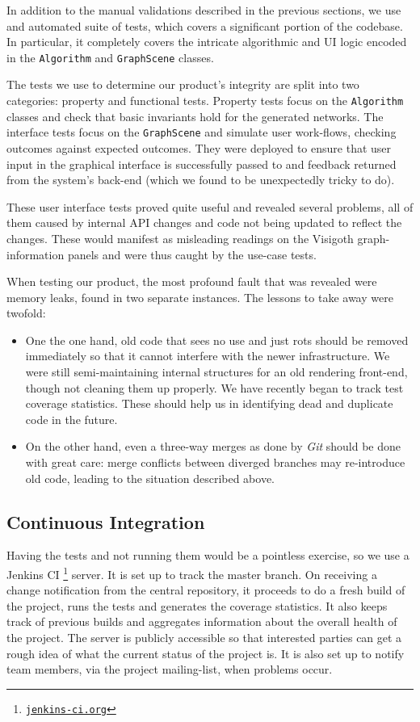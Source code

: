 \documentclass[a4paper,11pt,titlepage]{article}
\let\stdhref\href
\renewcommand{\href}[2]{\stdhref{#1}{\texttt{#2}}}
\newcommand{\code}[1]{\texttt{#1}}
\newcommand{\buzz}[1]{\emph{#1}}
\newcommand{\Git}{\buzz{Git} }
\begin{document}
In addition to the manual validations described in the previous
sections, we use and automated suite of tests, which covers a
significant portion of the codebase. In particular, it completely
covers the intricate algorithmic and UI logic encoded in the
\code{Algorithm} and \code{GraphScene} classes.

The tests we use to determine our product's integrity are split into
two categories: property and functional tests. Property tests focus on
the \code{Algorithm} classes and check that basic invariants hold for
the generated networks. The interface tests focus on the
\code{GraphScene} and simulate user work-flows, checking outcomes
against expected outcomes. They were deployed to ensure that user
input in the graphical interface is successfully passed to and
feedback returned from the system's back-end (which we found to be
unexpectedly tricky to do).

These user interface tests proved quite useful and revealed several
problems, all of them caused by internal API changes and code not
being updated to reflect the changes. These would manifest as
misleading readings on the Visigoth graph-information panels and were
thus caught by the use-case tests.

When testing our product, the most profound fault that was revealed
were memory leaks, found in two separate instances. The lessons to
take away were twofold:
\begin{itemize}
  \item One the one hand, old code that sees no use and just rots
    should be removed immediately so that it cannot interfere with the
    newer infrastructure. We were still semi-maintaining internal
    structures for an old rendering front-end, though not cleaning
    them up properly. We have recently began to track test coverage
    statistics. These should help us in identifying dead and duplicate
    code in the future.
  \item On the other hand, even a three-way merges as done by \Git
    should be done with great care: merge conflicts between diverged
    branches may re-introduce old code, leading to the situation
    described above.
\end{itemize}

\subsection{Continuous Integration}
Having the tests and not running them would be a pointless exercise,
so we use a Jenkins
CI \footnote{\href{http://jenkins-ci.org/}{jenkins-ci.org}} server. It
is set up to track the master branch. On receiving a change
notification from the central repository, it proceeds to do a fresh
build of the project, runs the tests and generates the coverage
statistics. It also keeps track of previous builds and aggregates
information about the overall health of the project.  The server is
publicly accessible so that interested parties can get a rough idea of
what the current status of the project is. It is also set up to notify
team members, via the project mailing-list, when problems occur.
\end{document}
